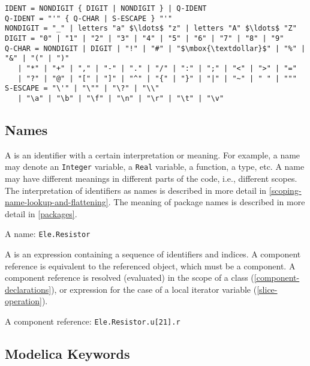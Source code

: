 \begin{lstlisting}[language=grammar]
IDENT = NONDIGIT { DIGIT | NONDIGIT } | Q-IDENT
Q-IDENT = "'" { Q-CHAR | S-ESCAPE } "'"
NONDIGIT = "_" | letters "a" $\ldots$ "z" | letters "A" $\ldots$ "Z"
DIGIT = "0" | "1" | "2" | "3" | "4" | "5" | "6" | "7" | "8" | "9"
Q-CHAR = NONDIGIT | DIGIT | "!" | "#" | "$\mbox{\textdollar}$" | "%" | "&" | "(" | ")"
   | "*" | "+" | "," | "-" | "." | "/" | ":" | ";" | "<" | ">" | "="
   | "?" | "@" | "[" | "]" | "^" | "{" | "}" | "|" | "~" | " " | """
S-ESCAPE = "\'" | "\"" | "\?" | "\\"
   | "\a" | "\b" | "\f" | "\n" | "\r" | "\t" | "\v"
\end{lstlisting}

\subsection{Names}\label{names}

A  is an identifier with a certain interpretation or meaning.
For example, a name may denote an \lstinline!Integer! variable, a \lstinline!Real! variable, a function, a type, etc.
A name may have different meanings in different parts of the code, i.e., different scopes.
The interpretation of identifiers as names is described in more detail in \cref{scoping-name-lookup-and-flattening}.
The meaning of package names is described in more detail in \cref{packages}.

\begin{example}
A name: \lstinline!Ele.Resistor!
\end{example}

A  is an expression containing a sequence of identifiers and indices.
A component reference is equivalent to the referenced object, which must be a component.
A component reference is resolved (evaluated) in the scope of a class (\cref{component-declarations}), or expression for the case of a local iterator variable (\cref{slice-operation}).

\begin{example}
A component reference: \lstinline!Ele.Resistor.u[21].r!
\end{example}

\subsection{Modelica Keywords}\label{modelica-keywords}

